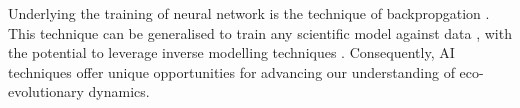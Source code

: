 % 
% 
%
% 
Underlying the training of neural network is the technique of backpropgation \citep{LeCun2015}. This technique can be generalised to train any scientific model against data \citep{Rackauckas2020}, with the potential to leverage inverse modelling techniques \citep{Frank2022}. %
% 
% 
Consequently, AI techniques offer unique opportunities for advancing our understanding of eco-evolutionary dynamics.


